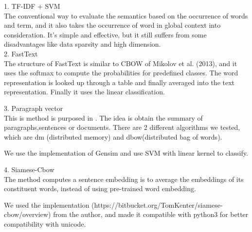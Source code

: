 1. TF-IDF + SVM \\

	The conventional way to evaluate the semantics based on the occurrence of words and term, and it also takes the occurrence of word in global context into consideration.  It's simple and effective, but it still suffers from some disadvantages like data sparsity and high dimension. \\
	
2. FastText \cite{joulin2016fasttext}\\
	
	The structure of FastText is similar to CBOW of Mikolov et al. (2013), and it uses the softmax to compute the probabilities for predefined classes. The word representation is looked up through a table and finally averaged into the text representation. Finally it uses the linear classification.

3. Paragraph vector \cite{PVDB}\\

	This is method is purposed in \cite{PVDB}. The idea is obtain the summary of paragraphs,sentences or documents. There are 2 different algorithms we tested, which are dm (distributed memory) and dbow(distributed bag of words).

We use the implementation of Gensim and use SVM with linear kernel to classify.

4. Siamese-Cbow\cite{kenter2016siamesecbow}\\

	The method computes a sentence embedding is to average the embeddings of its
constituent words, instead of using pre-trained word embedding.

	We used the implementation (https://bitbucket.org/TomKenter/siamese-cbow/overview) from the author, and made it compatible with python3 for better compatibility with unicode.
